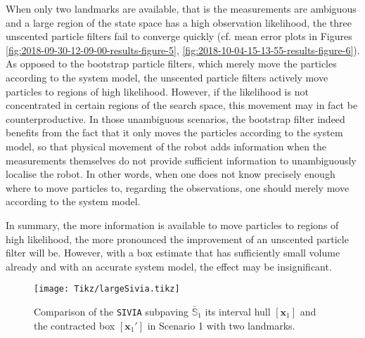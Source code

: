 


When only two landmarks are available, that is the measurements are ambiguous and a large region of the state space has a high observation likelihood, the three unscented particle filters fail to converge quickly (cf. mean error plots in Figures \ref{fig:2018-09-30-12-09-00-results-figure-5}, \ref{fig:2018-10-04-15-13-55-results-figure-6}). As opposed to the bootstrap particle filters, which merely move the particles according to the system model, the unscented particle filters actively move particles to regions of high likelihood. However, if the likelihood is not concentrated in certain regions of the search space, this movement may in fact be counterproductive. In those unambiguous scenarios, the bootstrap filter indeed benefits from the fact that it only moves the particles according to the system model, so that physical movement of the robot adds information when the measurements themselves do not provide sufficient information to unambiguously localise the robot. In other words, when one does not know precisely enough where to move particles to, regarding the observations, one should merely move according to the system model.

In summary, the more information is available to move particles to regions of high likelihood, the more pronounced the improvement of an unscented particle filter will be. However, with a box estimate that has sufficiently small volume already and with an accurate system model, the effect may be insignificant. 


\begin{figure}
	\centering
	\setlength{} 	
	\setlength{}		
	\texttt{[image: Tikz/largeSivia.tikz]}	
	\caption[Comparison of a \texttt{SIVIA} subpaving and a contracted box in Scenario 1.]{Comparison of the \texttt{SIVIA} subpaving $\bar{\mathbb{S}}_1$ its interval hull $[\bm{x}_1]$ and the contracted box $[\bm{x}_1']$ in Scenario 1 with two landmarks.}			
	\label{fig:largeSivia}			
\end{figure}

